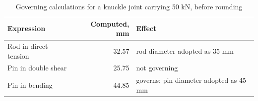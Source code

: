 \begin{table}[htbp]
\centering\footnotesize
\caption{Governing calculations for a knuckle joint carrying 50 kN, before rounding}\label{tab:raw}
\begin{tabularx}{\textwidth}{Xrl}
\toprule
Expression & Computed, mm & Effect \\
\midrule
Rod in direct tension & 32.57 & rod diameter adopted as 35 mm \\
Pin in double shear & 25.75 & not governing \\
Pin in bending & 44.85 & governs; pin diameter adopted as 45 mm \\
\bottomrule
\end{tabularx}
\end{table}
